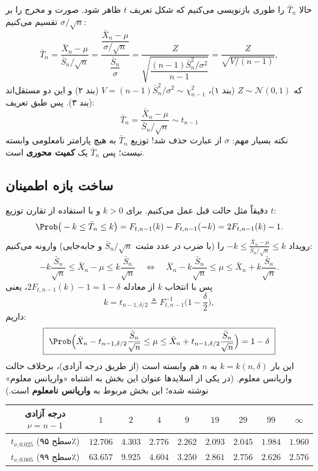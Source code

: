 حالا $\bar T_n$ را طوری بازنویسی می‌کنیم که شکل تعریف $t$ ظاهر شود. صورت و مخرج را بر $\sigma/\sqrt n$ تقسیم می‌کنیم:
\[
\bar T_n=\frac{\bar X_n-\mu}{\bar S_n/\sqrt n}
=\frac{\dfrac{\bar X_n-\mu}{\sigma/\sqrt n}}{\dfrac{\bar S_n}{\sigma}}
=\frac{Z}{\sqrt{\dfrac{(n-1)\bar S_n^2/\sigma^2}{n-1}}}
=\frac{Z}{\sqrt{V/(n-1)}},
\]
که $Z\sim\mathcal N(0,1)$ (بند ۱)، $V=(n-1)\bar S_n^2/\sigma^2\sim\chi^2_{n-1}$ (بند ۲) و این دو مستقل‌اند (بند ۳). پس طبق تعریف:
\[
\boxed{\ \bar T_n=\frac{\bar X_n-\mu}{\bar S_n/\sqrt n}\sim t_{n-1}\ }
\]
نکته بسیار مهم: $\sigma$ از عبارت حذف شد! توزیع $\bar T_n$ به هیچ پارامتر نامعلومی وابسته نیست؛ پس $\bar T_n$ یک \textbf{کمیت محوری} است.

\subsection{ساخت بازه اطمینان}
دقیقاً مثل حالت قبل عمل می‌کنیم. برای $k>0$ و با استفاده از تقارن توزیع $t$:
\[
\Prob\big(-k\le\bar T_n\le k\big)=F_{t,n-1}(k)-F_{t,n-1}(-k)=2F_{t,n-1}(k)-1 .
\]
رویداد $-k\le\frac{\bar X_n-\mu}{\bar S_n/\sqrt n}\le k$ را (با ضرب در عدد مثبت $\bar S_n/\sqrt n$ و جابه‌جایی) وارونه می‌کنیم:
\[
-k\frac{\bar S_n}{\sqrt n}\le\bar X_n-\mu\le k\frac{\bar S_n}{\sqrt n}
\quad\Longleftrightarrow\quad
\bar X_n-k\frac{\bar S_n}{\sqrt n}\le\mu\le\bar X_n+k\frac{\bar S_n}{\sqrt n}.
\]
پس با انتخاب $k$ از معادله $2F_{t,n-1}(k)-1=1-\delta$، یعنی
\[
k=t_{n-1,\delta/2}\triangleq F_{t,n-1}^{-1}\Big(1-\frac\delta2\Big),
\]
داریم:
\[
\boxed{\ \Prob\Big(\bar X_n-t_{n-1,\delta/2}\frac{\bar S_n}{\sqrt n}\le\mu\le\bar X_n+t_{n-1,\delta/2}\frac{\bar S_n}{\sqrt n}\Big)=1-\delta\ }
\]
این بار $k=k(n,\delta)$ به $n$ هم وابسته است (از طریق درجه آزادی)، برخلاف حالت واریانس معلوم. (در یکی از اسلایدها عنوان این بخش به اشتباه «واریانس معلوم» نوشته شده؛ این بخش مربوط به \textbf{واریانس نامعلوم} است.)

\begin{center}
\renewcommand{\arraystretch}{1.4}
\begin{tabular}{c|c|c|c|c|c|c|c|c}
درجه آزادی $\nu=n-1$ & $1$ & $2$ & $4$ & $9$ & $19$ & $29$ & $99$ & $\infty$\\\hline
$t_{\nu,0.025}$ (سطح ۹۵٪) & $12.706$ & $4.303$ & $2.776$ & $2.262$ & $2.093$ & $2.045$ & $1.984$ & $1.960$\\
$t_{\nu,0.005}$ (سطح ۹۹٪) & $63.657$ & $9.925$ & $4.604$ & $3.250$ & $2.861$ & $2.756$ & $2.626$ & $2.576$
\end{tabular}
\end{center}

